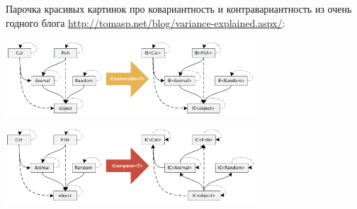 \documentclass[a5paper]{article}
\begin{document}
Парочка красивых картинок про ковариантность и контравариантность из очень годного блога \url{http://tomasp.net/blog/variance-explained.aspx/}:

\begin{center}
    \includegraphics[width=0.7\textwidth]{covariantFunctors.png}

    \vspace{4mm}
    \includegraphics[width=0.7\textwidth]{contravariantFunctors.png}
\end{center}
\end{document}

